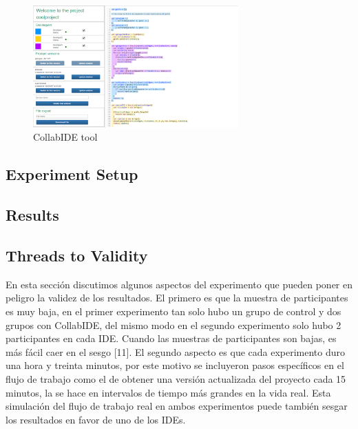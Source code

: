 \begin{figure}[htbp]
  \centering
  \includegraphics[width=0.7\textwidth]{img/fig1-collabIDEGeneral}
  \caption{CollabIDE tool}
  \label{fig:collabide}
\end{figure}

\subsection{Experiment Setup}

	

\subsection{Results}


\subsection{Threads to Validity}
En esta sección discutimos algunos aspectos del experimento que pueden poner en peligro la validez de los resultados. El primero es que la muestra de participantes es muy baja, en el primer experimento tan solo hubo un grupo de control y dos grupos con CollabIDE, del mismo modo en el segundo experimento solo hubo 2 participantes en cada IDE. Cuando las muestras de participantes son bajas, es más fácil caer en el sesgo [11]. El segundo aspecto es que cada experimento duro una hora y treinta minutos, por este motivo se incluyeron pasos específicos en el flujo de trabajo como el de obtener una versión actualizada del proyecto cada 15 minutos, la se hace en intervalos de tiempo más grandes en la vida real. Esta simulación del flujo de trabajo real en ambos experimentos puede también sesgar los resultados en favor de uno de los IDEs.  


\endinput